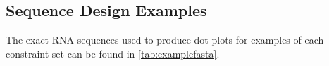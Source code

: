 \documentclass[../../master.tex]{subfiles}
\begin{document}
\subsection{Sequence Design Examples}
\label{sub:appendix:examplesequence}

The exact RNA sequences used to produce dot plots for examples of each constraint set can be found in \autoref{tab:examplefasta}.

%	

\end{document}
